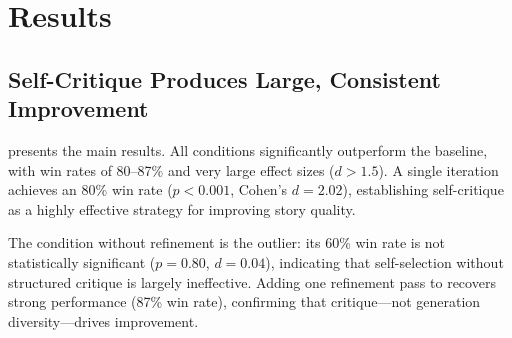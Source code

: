\section{Results}
\label{sec:results}

\subsection{Self-Critique Produces Large, Consistent Improvement}
\label{sec:main_results}

 presents the main results.
All \selfrefine conditions significantly outperform the baseline, with win rates of 80--87\% and very large effect sizes ($d > 1.5$).
A single \critiquerevise iteration achieves an 80\% win rate ($p < 0.001$, Cohen's $d = 2.02$), establishing self-critique as a highly effective strategy for improving story quality.

\begin{table}[t]
\centering
\caption{Main results: pairwise comparison of each condition against the \baseline. Win\% indicates how often the condition was preferred over baseline by the blind judge. Mean $\Delta$ is the average score difference across six dimensions. All $p$-values from Wilcoxon signed-rank tests with Bonferroni correction.}
\label{tab:main}
\end{table}

The \bestofn condition without refinement is the outlier: its 60\% win rate is not statistically significant ($p = 0.80$, $d = 0.04$), indicating that self-selection without structured critique is largely ineffective.
Adding one refinement pass to \bestofn recovers strong performance (87\% win rate), confirming that critique---not generation diversity---drives improvement.

